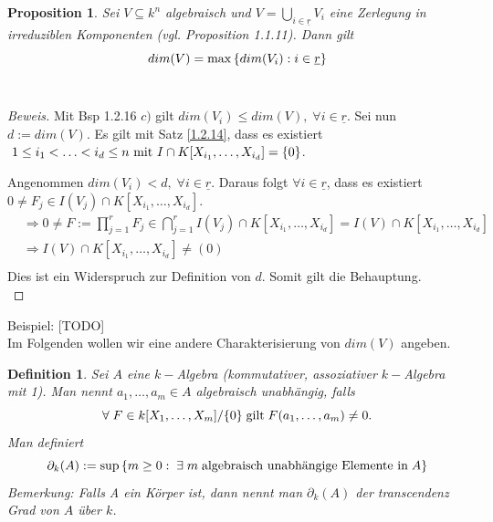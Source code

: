 \documentclass{article}
\newtheorem{definition}[satz]{Definition}
\newtheorem{proposition}[satz]{Proposition}
\newcommand*{\indx}[2]{{#1}_{#2}}
\begin{document}
\begin{proposition}
	Sei $V\subseteq k^n$ algebraisch und $V=\bigcup\limits_{i\in\underline{r}}\indx{V}{i}$ eine Zerlegung in irreduziblen Komponenten (vgl. Proposition 1.1.11). Dann gilt
	\begin{displaymath}
	dim(V)=\max{\{dim(\indx{V}{i}):i\in\underline{r}\}}\\
	\end{displaymath}
	\\
\end{proposition}
\begin{proof}[Beweis]
	Mit Bsp 1.2.16 $c)$ gilt $dim(\indx{V}{i})\leq dim(V),\; \forall i\in \underline{r} $. Sei nun $d:=dim(V)$. Es gilt mit Satz \ref{1.2.14}, dass es existiert $\; 1\leq\indx{i}{1}<\ldots<\indx{i}{d}\leq n \textnormal{ mit } I\cap K[\indx{X}{\indx{i}{1}},\ldots,\indx{X}{\indx{i}{d}}]=\{0\}$.
	
	Angenommen $dim(\indx{V}{i})<d,\; \forall i\in \underline{r}$. Daraus folgt $\forall i\in \underline{r}$, dass es existiert $0\neq\indx{F}{j}\in I(\indx{V}{j})\cap K[\indx{X}{\indx{i}{1}},\ldots,\indx{X}{\indx{i}{d}}]$.
	\begin{align*}
	&\Rightarrow 0\neq F:=\prod_{j=1}^{r}\indx{F}{j}\in \bigcap\limits_{j=1}^{r}I(\indx{V}{j}) \cap K[\indx{X}{\indx{i}{1}},\ldots,\indx{X}{\indx{i}{d}}]=I(V) \cap K[\indx{X}{\indx{i}{1}},\ldots,\indx{X}{\indx{i}{d}}]\\&
	\Rightarrow I(V)\cap K[\indx{X}{\indx{i}{1}},\ldots,\indx{X}{\indx{i}{d}}]\neq (0)\\
	\end{align*}
	Dies ist ein Widerspruch zur Definition von $d$. Somit gilt die Behauptung.\\
\end{proof}

Beispiel: [TODO]\\

Im Folgenden wollen wir eine andere Charakterisierung von $dim(V)$ angeben. 
\begin{definition}
	Sei $A$ eine $k-$Algebra (kommutativer, assoziativer $k-$Algebra mit 1). Man nennt $\indx{a}{1},\ldots,\indx{a}{m}\in A$ algebraisch unabhängig, falls 
	\begin{displaymath}
	\forall \;F\in k[\indx{X}{1},\ldots,\indx{X}{m}]/\{0\} \;\textnormal{gilt}\; F(\indx{a}{1},\ldots,\indx{a}{m})\neq0.
	\end{displaymath}
	Man definiert
	\begin{displaymath}
	\indx{\partial}{k}(A):=\sup{\{m\geq0:\;\exists\; m \;\textnormal{algebraisch unabhängige Elemente in}\; A\}}
	\end{displaymath}
Bemerkung: Falls A ein Körper ist, dann nennt man $\indx{\partial}{k}(A)$ der transcendenz Grad von $A$ über $k$.\\
\end{definition}
\end{document}
